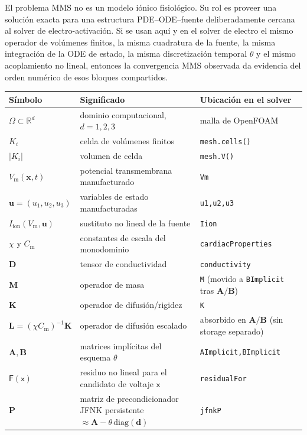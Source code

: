 \documentclass[11pt,a4paper]{article}
\newcommand{\code}[1]{\texttt{\small #1}}
\newcommand{\Vm}{V_{\text{m}}}
\newcommand{\Iion}{I_{\mathrm{ion}}}
\newcommand{\Dten}{\mathbf{D}}
\newcommand{\Mmass}{\mathbf{M}}
\newcommand{\Kstif}{\mathbf{K}}
\newcommand{\Lop}{\mathbf{L}}
\newcommand{\Aimp}{\mathbf{A}}
\newcommand{\Bimp}{\mathbf{B}}
\newcommand{\Fres}{\mathsf{F}}
\newcommand{\R}{\mathbb{R}}
\begin{document}
El problema MMS no es un modelo iónico fisiológico. Su rol es proveer una solución exacta
para una estructura PDE--ODE--fuente deliberadamente cercana al solver de
electro-activación. Si se usan aquí y en el solver de electro el mismo operador de
volúmenes finitos, la misma cuadratura de la fuente, la misma integración de la ODE de
estado, la misma discretización temporal $\theta$ y el mismo acoplamiento no lineal,
entonces la convergencia MMS observada da evidencia del orden numérico de esos bloques
compartidos.

\begin{center}
\footnotesize
\begin{tabular}{@{}lll@{}}
\toprule
Símbolo & Significado & Ubicación en el solver \\
\midrule
$\Omega\subset\R^d$ & dominio computacional, $d=1,2,3$ & malla de OpenFOAM \\
$K_i$ & celda de volúmenes finitos & \code{mesh.cells()} \\
$|K_i|$ & volumen de celda & \code{mesh.V()} \\
$\Vm(\mathbf{x},t)$ & potencial transmembrana manufacturado & \code{Vm} \\
$\mathbf{u}=(u_1,u_2,u_3)$ & variables de estado manufacturadas & \code{u1,u2,u3} \\
$\Iion(\Vm,\mathbf{u})$ & sustituto no lineal de la fuente & \code{Iion} \\
$\chi$ y $C_{\text{m}}$ & constantes de escala del monodominio & \code{cardiacProperties} \\
$\Dten$ & tensor de conductividad & \code{conductivity} \\
$\Mmass$ & operador de masa & \code{M} (movido a \code{BImplicit} tras $\Aimp/\Bimp$) \\
$\Kstif$ & operador de difusión/rigidez & \code{K} \\
$\Lop=(\chi C_{\text{m}})^{-1}\Kstif$ & operador de difusión escalado & absorbido en $\Aimp/\Bimp$ (sin storage separado) \\
$\Aimp,\Bimp$ & matrices implícitas del esquema $\theta$ & \code{AImplicit,BImplicit} \\
$\Fres(\mathsf{x})$ & residuo no lineal para el candidato de voltaje $\mathsf{x}$ & \code{residualFor} \\
$\mathbf{P}$ & matriz de precondicionador JFNK persistente $\approx\Aimp-\theta\,\mathrm{diag}(\mathbf{d})$ & \code{jfnkP} \\
\bottomrule
\end{tabular}
\end{center}
\end{document}
